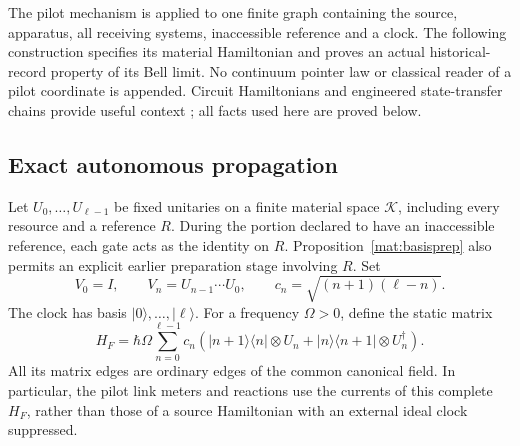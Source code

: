 \documentclass[11pt]{article}
\theoremstyle{definition}\newtheorem{definition}[theorem]{Definition}
\theoremstyle{remark}\newtheorem{remark}[theorem]{Remark}
\begin{document}
The pilot mechanism is applied to one finite graph containing the source,
apparatus, all receiving systems, inaccessible reference and a clock.  The
following construction specifies its material Hamiltonian and proves an
actual historical-record property of its Bell limit.  No continuum pointer
law or classical reader of a pilot coordinate is appended.  Circuit
Hamiltonians and engineered state-transfer chains provide useful context
\cite{Feynman1986,Christandl2004}; all facts used here are proved below.

\subsection{Exact autonomous propagation}

Let $U_0,\ldots,U_{\ell-1}$ be fixed unitaries on a finite material space
$\mathcal K$, including every resource and a reference $R$.  During the
portion declared to have an inaccessible reference, each gate acts as
the identity on $R$.  Proposition~\ref{mat:basisprep} also permits an
explicit earlier preparation stage involving $R$.  Set
\begin{equation}\label{mat:prefix}
 V_0=I,\qquad V_n=U_{n-1}\cdots U_0,\qquad
 c_n=\sqrt{(n+1)(\ell-n)}.
\end{equation}
The clock has basis $|0\rangle,\ldots,|\ell\rangle$.  For a frequency
$\Omega>0$, define the static matrix
\begin{equation}\label{mat:feynman}
 H_F=\hbar\Omega\sum_{n=0}^{\ell-1}c_n
 \left(|n+1\rangle\langle n|\otimes U_n+
 |n\rangle\langle n+1|\otimes U_n^\dagger\right).
\end{equation}
All its matrix edges are ordinary edges of the common canonical field.
In particular, the pilot link meters and reactions use the currents of
this complete $H_F$, rather than those of a source Hamiltonian with an
external ideal clock suppressed.
\end{document}
